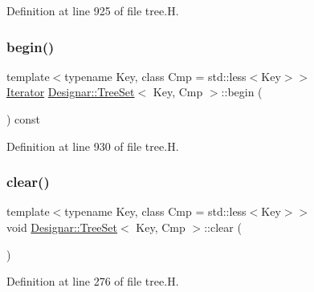 Definition at line 925 of file tree.\+H.

\mbox{\label{class_designar_1_1_tree_set_ae2bb7c7ab6f5079bc8995821aa9bedfb}} 
\subsubsection{\texorpdfstring{begin()}{begin()}\hspace{0.1cm}{\footnotesize\ttfamily [2/2]}}
{\footnotesize\ttfamily template$<$typename Key, class Cmp = std\+::less$<$\+Key$>$$>$ \\
\hyperlink{class_designar_1_1_tree_set_1_1_iterator}{Iterator} \hyperlink{class_designar_1_1_tree_set}{Designar\+::\+Tree\+Set}$<$ Key, Cmp $>$\+::begin (\begin{DoxyParamCaption}{ }\end{DoxyParamCaption}) const\hspace{0.3cm}{\ttfamily [inline]}}



Definition at line 930 of file tree.\+H.

\mbox{\label{class_designar_1_1_tree_set_af3b2a6ab8c7f7fd7c319a392c33fd9d6}} 
\subsubsection{\texorpdfstring{clear()}{clear()}}
{\footnotesize\ttfamily template$<$typename Key, class Cmp = std\+::less$<$\+Key$>$$>$ \\
void \hyperlink{class_designar_1_1_tree_set}{Designar\+::\+Tree\+Set}$<$ Key, Cmp $>$\+::clear (\begin{DoxyParamCaption}{ }\end{DoxyParamCaption})\hspace{0.3cm}{\ttfamily [inline]}}



Definition at line 276 of file tree.\+H.

\mbox{\label{class_designar_1_1_tree_set_a4069f037294163ea3686689c04486c58}} 
